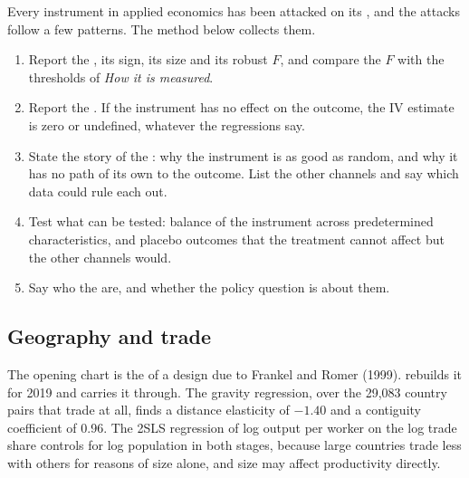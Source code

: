 Every instrument in applied economics has been attacked on its , and the attacks follow a few patterns. The method below collects
them.

\begin{method}\label{met:b3:instrumental-variables:examine}
\begin{enumerate}
\item Report the , its sign, its size and its robust $F$, and
compare the $F$ with the thresholds of \emph{How it is measured}.
\item Report the . If the instrument has no effect on the
outcome, the IV estimate is zero or undefined, whatever the regressions say.
\item State the story of the : why the instrument is as
good as random, and why it has no path of its own to the outcome. List the
other channels and say which data could rule each out.
\item Test what can be tested: balance of the instrument across predetermined
characteristics, and placebo outcomes that the treatment cannot affect but the
other channels would.
\item Say who the  are, and whether the policy question is about
them.
\end{enumerate}
\end{method}

\subsection*{Geography and trade}

The opening chart is the  of a design due to Frankel and Romer
(1999).  rebuilds it for 2019 and
carries it through. The gravity regression, over the 29{,}083 country pairs
that trade at all, finds a distance elasticity of $-1.40$ and a contiguity
coefficient of 0.96. %
The 2SLS regression of log output per worker on the log trade share controls
for log population in both stages, because large countries trade less with
others for reasons of size alone, and size may affect productivity directly.

